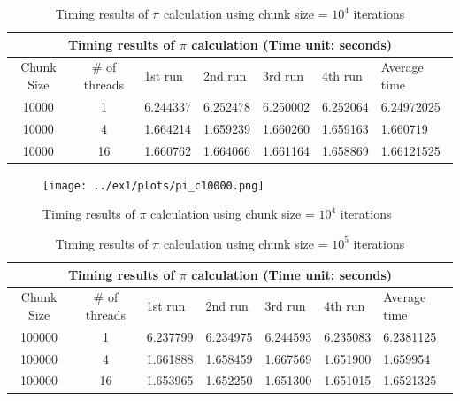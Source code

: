 \documentclass{article}
\begin{document}


\begin{table}[htbp]
  \centering
    \begin{tabular}{|c c||l l l l| l|} 
    \hline
    \multicolumn{7}{|c|}{Timing results of $\pi$ calculation (Time unit: seconds)} \\
    \hline
    Chunk Size & \# of threads & 1st run & 2nd run & 3rd run & 4th run & Average time\\ [0.5ex] 
    \hline\hline
    10000 & 1 & 6.244337 & 6.252478 & 6.250002 & 6.252064 & 6.24972025 \\
    \hline
    10000 & 4 & 1.664214 & 1.659239 & 1.660260 & 1.659163 & 1.660719 \\
    \hline
    10000 & 16 & 1.660762 & 1.664066 & 1.661164 & 1.658869 & 1.66121525 \\ [1ex]
    \hline
    \end{tabular}
  \caption{Timing results of $\pi$ calculation using chunk size = $10^4$ iterations}
\end{table}

\begin{figure}[htbp]
  \centering
  \texttt{[image: ../ex1/plots/pi\_c10000.png]}
  \caption{Timing results of $\pi$ calculation using chunk size = $10^4$ iterations}
\end{figure}



\begin{table}[htbp]
  \centering
    \begin{tabular}{|c c||l l l l| l|} 
    \hline
    \multicolumn{7}{|c|}{Timing results of $\pi$ calculation (Time unit: seconds)} \\
    \hline
    Chunk Size & \# of threads & 1st run & 2nd run & 3rd run & 4th run & Average time\\ [0.5ex] 
    \hline\hline
    100000 & 1 & 6.237799 & 6.234975 & 6.244593 & 6.235083 & 6.2381125 \\
    \hline
    100000 & 4 & 1.661888 & 1.658459 & 1.667569 & 1.651900 & 1.659954 \\
    \hline
    100000 & 16 & 1.653965 & 1.652250 & 1.651300 & 1.651015 & 1.6521325 \\ [1ex]
    \hline
    \end{tabular}
  \caption{Timing results of $\pi$ calculation using chunk size = $10^5$ iterations}
\end{table}
\end{document}
